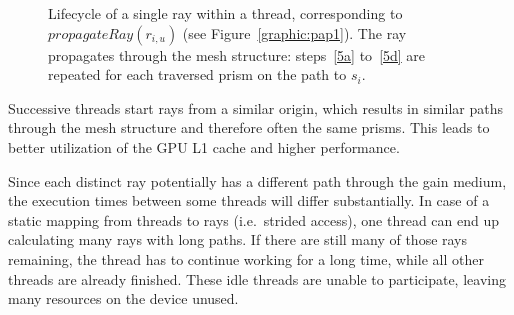 \begin{figure}[H]
  \centerline
      {}
  \caption{Lifecycle of a single ray within a thread, corresponding to
    $propagateRay(r_{i,u})$ (see Figure~\ref{graphic:pap1}). The ray
    propagates through the mesh structure: steps~\ref{5a} to~\ref{5d}
    are repeated for each traversed prism on the path to $s_i$.}

  \label{graphic:algorithm_steps}
\end{figure}
Successive threads start rays from a similar origin, which results in
similar paths through the mesh structure and therefore often the same
prisms. This leads to better utilization of the GPU L1 cache and
higher performance.

Since each distinct ray potentially has a different path through the
gain medium, the execution times between some threads will differ
substantially. In case of a static mapping from threads to rays
(i.e.\ strided access), one thread can end up calculating many rays
with long paths. If there are still many of those rays remaining, the
thread has to continue working for a long time, while all other
threads are already finished. These idle threads are unable to
participate, leaving many resources on the device unused.

